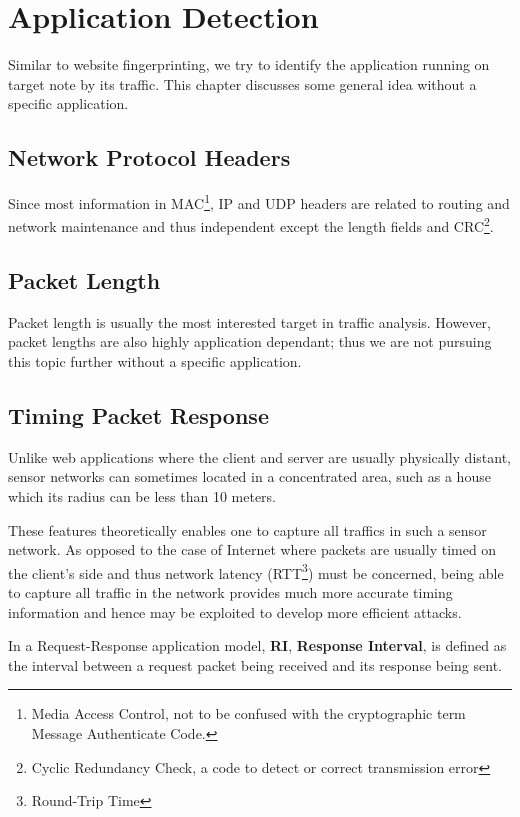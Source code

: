 \chapter{Application Detection}
Similar to website fingerprinting, we try to identify the application running on target note by its traffic. This chapter discusses some general idea without a specific application.

\section{Network Protocol Headers}
Since most information in MAC\footnote{Media Access Control, not to be confused with the cryptographic term Message Authenticate Code.}, IP and UDP headers are related to routing and network maintenance and thus independent except the length fields and CRC\footnote{Cyclic Redundancy Check, a code to detect or correct transmission error}. 

\section{Packet Length}
Packet length is usually the most interested target in traffic analysis. However, packet lengths are also highly application dependant; thus we are not pursuing this topic further without a specific application.

\section{Timing Packet Response}
Unlike web applications where the client and server are usually physically distant, sensor networks can sometimes located in a concentrated area, such as a house which its radius can be less than 10 meters. 

These features theoretically enables one to capture all traffics in such a sensor network. As opposed to the case of Internet where packets are usually timed on the client’s side and thus network latency (RTT\footnote{Round-Trip Time}) must be concerned, being able to capture all traffic in the network provides  much more accurate timing information and hence may be exploited to develop more efficient attacks.

\begin{definition}
In a Request-Response application model, \textbf{RI}, {\bf Response Interval}, is defined as the interval between a request packet being received and its response being sent.
\end{definition}

